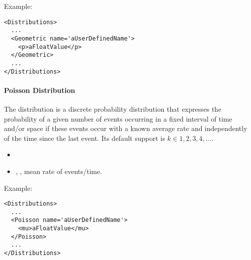 Example:
\begin{lstlisting}[style=XML]
<Distributions>
  ...
  <Geometric name='aUserDefinedName'>
    <p>aFloatValue</p>
  </Geometric>
  ...
</Distributions>
\end{lstlisting}

\paragraph{Poisson Distribution}
\label{Poisson}
The  distribution is a discrete probability distribution that
expresses the probability of a given number of events occurring in a fixed
interval of time and/or space if these events occur with a known average rate
and independently of the time since the last event.
%
Its default support is $k \in {1, 2, 3, 4, ...}$.

%
\attrIntro
\vspace{-5mm}
\begin{itemize}
  \itemsep0em
  \item \nameDescription
\end{itemize}
\vspace{-5mm}
\subnodeIntro
\begin{itemize}
  \item {}, , mean rate of
  events/time.
\end{itemize}

Example:
\begin{lstlisting}[style=XML]
<Distributions>
  ...
  <Poisson name='aUserDefinedName'>
    <mu>aFloatValue</mu>
  </Poisson>
  ...
</Distributions>
\end{lstlisting}


